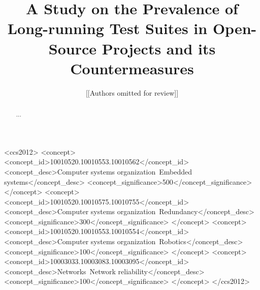 \documentclass[sigconf]{acmart}
\begin{document}






\title{A Study on the Prevalence of Long-running Test Suites in
  Open-Source Projects and its Countermeasures
}




\author{[[Authors omitted for review]]}


\begin{abstract}
  ...
\end{abstract}


\begin{CCSXML}
<ccs2012>
 <concept>
  <concept_id>10010520.10010553.10010562</concept_id>
  <concept_desc>Computer systems organization~Embedded systems</concept_desc>
  <concept_significance>500</concept_significance>
 </concept>
 <concept>
  <concept_id>10010520.10010575.10010755</concept_id>
  <concept_desc>Computer systems organization~Redundancy</concept_desc>
  <concept_significance>300</concept_significance>
 </concept>
 <concept>
  <concept_id>10010520.10010553.10010554</concept_id>
  <concept_desc>Computer systems organization~Robotics</concept_desc>
  <concept_significance>100</concept_significance>
 </concept>
 <concept>
  <concept_id>10003033.10003083.10003095</concept_id>
  <concept_desc>Networks~Network reliability</concept_desc>
  <concept_significance>100</concept_significance>
 </concept>
</ccs2012>  
\end{CCSXML}
\end{document}
